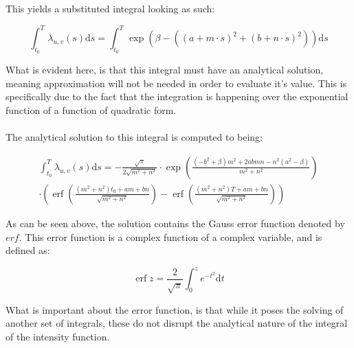 This yields a substituted integral looking as such:

\begin{equation}
    \int_{t_0}^T \lambda_{u,v}(s) \mathrm{d}s 
    =
    \int_{t_0}^T \exp \left(\beta - \left((a + m \cdot s)^2 + (b + n \cdot s)^2\right)\right) \mathrm{d}s
\end{equation}

What is evident here, is that this integral must have an analytical solution, meaning approximation will not be needed in order to evaluate it's value. 
This is specifically due to the fact that the integration is happening over the exponential function of a function of quadratic form.
\\\\
The analytical solution to this integral is computed to being:


\begin{align}
    \int_{t_0}^T \lambda_{u,v}(s) \mathrm{d}s
    = 
    -\frac{\sqrt{\pi}}{2 \sqrt{m^{2}+n^{2}}}
    \cdot
    \exp\left(\frac{\left(-b^{2}+\beta\right) m^{2}+2abmn-n^{2}(a^{2}-\beta)}{m^{2}+n^{2}}\right)
    \\
    \cdot 
    \left(
    \operatorname{erf}\left(\frac{\left(m^{2}+n^{2}\right)t_{0}+am+b n}{\sqrt{m^{2}+n^{2}}}\right)
    -\operatorname{erf}\left(\frac{\left(m^{2}+n^{2}\right)T+am+b n}{\sqrt{m^{2}+n^{2}}}\right)
    \right)
    \label{eq:analytical_integral}
\end{align}

As can be seen above, the solution contains the Gauss error function denoted by $erf$.
This error function is a complex function of a complex variable, and is defined as:

\begin{equation}
\operatorname{erf} z=\frac{2}{\sqrt{\pi}} \int_{0}^{z} e^{-t^{2}} \mathrm{d} t
\end{equation}

What is important about the error function, is that while it poses the solving of another set of integrals, these do not disrupt the analytical nature of the integral of the intensity function.
